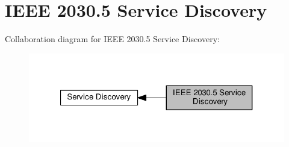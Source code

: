 \hypertarget{group__se__discover}{}\section{I\+E\+EE 2030.5 Service Discovery}
\label{group__se__discover}
Collaboration diagram for I\+E\+EE 2030.5 Service Discovery\+:\nopagebreak
\begin{figure}[H]
\begin{center}
\leavevmode
\includegraphics[width=321pt]{group__se__discover}
\end{center}
\end{figure}
